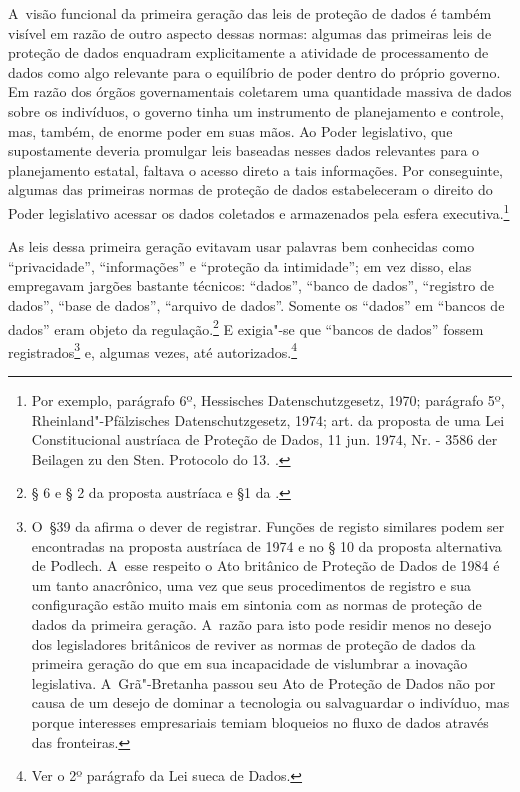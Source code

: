 A~visão funcional da primeira geração das leis de proteção de dados é
também visível em razão de outro aspecto dessas normas: algumas das
primeiras leis de proteção de dados enquadram explicitamente a atividade
de processamento de dados como algo relevante para o equilíbrio de poder
dentro do próprio governo. Em razão dos órgãos governamentais coletarem
uma quantidade massiva de dados sobre os indivíduos, o governo tinha um
instrumento de planejamento e controle, mas, também, de enorme poder em
suas mãos. Ao Poder legislativo, que supostamente deveria promulgar leis
baseadas nesses dados relevantes para o planejamento estatal, faltava o
acesso direto a tais informações. Por conseguinte, algumas das primeiras
normas de proteção de dados estabeleceram o direito do Poder legislativo
acessar os dados coletados e armazenados pela esfera
executiva.\footnote{Por exemplo, parágrafo 6º, Hessisches
  Datenschutzgesetz, 1970; parágrafo 5º, Rheinland"-Pfälzisches
  Datenschutzgesetz, 1974; art.  da proposta de uma Lei
  Constitucional austríaca de Proteção de Dados, 11 jun. 1974, Nr.  -
  3586 der Beilagen zu den Sten. Protocolo do  13. .}

As leis dessa primeira geração evitavam usar palavras bem conhecidas
como ``privacidade'', ``informações'' e ``proteção da intimidade''; em
vez disso, elas empregavam jargões bastante técnicos: ``dados'', ``banco
de dados'', ``registro de dados'', ``base de dados'', ``arquivo de
dados''. Somente os ``dados'' em ``bancos de dados'' eram objeto da
regulação.\footnote{§ 6 e § 2 da proposta austríaca e §1 da .} E
exigia"-se que ``bancos de dados'' fossem registrados\footnote{O~§39 da
   afirma o dever de registrar. Funções de registo similares podem
  ser encontradas na proposta austríaca de 1974 e no § 10 da proposta
  alternativa de Podlech. A~esse respeito o Ato britânico de Proteção de
  Dados de 1984 é um tanto anacrônico, uma vez que seus procedimentos de
  registro e sua configuração estão muito mais em sintonia com as normas
  de proteção de dados da primeira geração. A~razão para isto pode
  residir menos no desejo dos legisladores britânicos de reviver as
  normas de proteção de dados da primeira geração do que em sua
  incapacidade de vislumbrar a inovação legislativa. A~Grã"-Bretanha
  passou seu Ato de Proteção de Dados não por causa de um desejo de
  dominar a tecnologia ou salvaguardar o indivíduo, mas porque
  interesses empresariais temiam bloqueios no fluxo de dados através das
  fronteiras.} e, algumas vezes, até autorizados.\footnote{Ver o 2º
  parágrafo da Lei sueca de Dados.}


